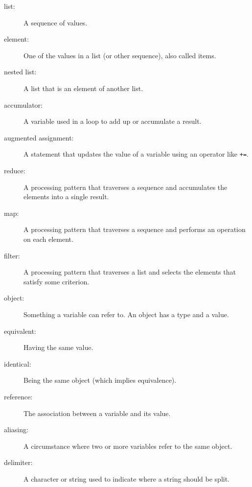 \documentclass[10pt]{book}
\begin{document}
\begin{description}

\item[list:] A sequence of values.

\item[element:] One of the values in a list (or other sequence),
also called items.

\item[nested list:] A list that is an element of another list.

\item[accumulator:] A variable used in a loop to add up or
accumulate a result.

\item[augmented assignment:] A statement that updates the value
of a variable using an operator like \verb"+=".

\item[reduce:] A processing pattern that traverses a sequence
and accumulates the elements into a single result.

\item[map:] A processing pattern that traverses a sequence and
performs an operation on each element.

\item[filter:] A processing pattern that traverses a list and
selects the elements that satisfy some criterion.

\item[object:] Something a variable can refer to.  An object
has a type and a value.

\item[equivalent:] Having the same value.

\item[identical:] Being the same object (which implies equivalence).

\item[reference:] The association between a variable and its value.

\item[aliasing:] A circumstance where two or more variables refer to the same
object.

\item[delimiter:] A character or string used to indicate where a
string should be split.

\end{description}
\end{document}

